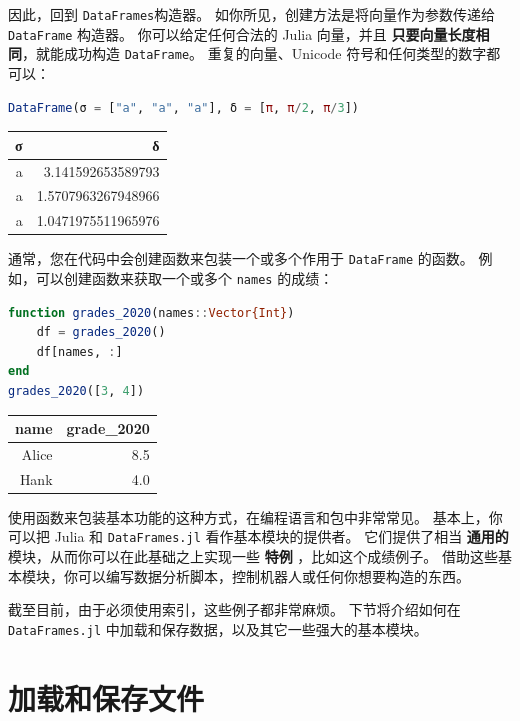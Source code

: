 \documentclass[
  notoc %
]{tufte-book}
\newcommand{\passthrough}[1]{#1}
\begin{document}
因此，回到 \passthrough{\lstinline!DataFrames!}构造器。
如你所见，创建方法是将向量作为参数传递给
\passthrough{\lstinline!DataFrame!} 构造器。 你可以给定任何合法的 Julia
向量，并且 \textbf{只要向量长度相同}，就能成功构造
\passthrough{\lstinline!DataFrame!}。 重复的向量、Unicode
符号和任何类型的数字都可以：

\begin{lstlisting}[language=Julia]
DataFrame(σ = ["a", "a", "a"], δ = [π, π/2, π/3])
\end{lstlisting}

\begin{longtable}[]{@{}rr@{}}
\toprule
σ & δ \\
\midrule
\endhead
a & 3.141592653589793 \\
a & 1.5707963267948966 \\
a & 1.0471975511965976 \\
\bottomrule
\end{longtable}

通常，您在代码中会创建函数来包装一个或多个作用于
\passthrough{\lstinline!DataFrame!} 的函数。
例如，可以创建函数来获取一个或多个 \passthrough{\lstinline!names!}
的成绩：

\begin{lstlisting}[language=Julia]
function grades_2020(names::Vector{Int})
    df = grades_2020()
    df[names, :]
end
grades_2020([3, 4])
\end{lstlisting}

\begin{longtable}[]{@{}rr@{}}
\toprule
name & grade\_2020 \\
\midrule
\endhead
Alice & 8.5 \\
Hank & 4.0 \\
\bottomrule
\end{longtable}

使用函数来包装基本功能的这种方式，在编程语言和包中非常常见。
基本上，你可以把 Julia 和 \passthrough{\lstinline!DataFrames.jl!}
看作基本模块的提供者。 它们提供了相当 \textbf{通用的}
模块，从而你可以在此基础之上实现一些 \textbf{特例} ，比如这个成绩例子。
借助这些基本模块，你可以编写数据分析脚本，控制机器人或任何你想要构造的东西。

截至目前，由于必须使用索引，这些例子都非常麻烦。 下节将介绍如何在
\passthrough{\lstinline!DataFrames.jl!}
中加载和保存数据，以及其它一些强大的基本模块。

\hypertarget{sec:load_save}{%
\section{加载和保存文件}\label{sec:load_save}}
\end{document}
